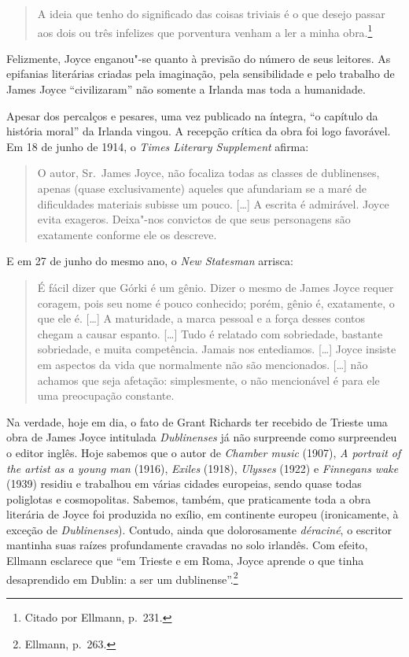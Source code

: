 \begin{quote}
A ideia que tenho do significado
das coisas triviais é o que desejo passar aos dois ou três infelizes que
porventura venham a ler a minha obra.\footnote{ Citado por Ellmann, p.~231.}
\end{quote}

Felizmente, Joyce enganou"-se quanto à previsão do número de seus leitores. As
epifanias literárias criadas pela imaginação, pela sensibilidade e pelo
trabalho de James Joyce “civilizaram” não somente a Irlanda mas toda a
humanidade.

Apesar dos percalços e pesares, uma vez publicado na íntegra, “o capítulo da
história moral” da Irlanda vingou. A recepção crítica da obra foi logo
favorável.  Em 18 de junho de 1914, o \textit{Times Literary Supplement}
afirma:

\begin{quote}
O autor, Sr.~James Joyce, não focaliza todas as classes de dublinenses, apenas
(quase exclusivamente) aqueles que afundariam se a maré de dificuldades
materiais subisse um pouco. [\ldots{}] A escrita é admirável. Joyce evita exageros.
Deixa"-nos convictos de que seus personagens são exatamente conforme ele os
descreve.
\end{quote}

E em 27 de junho do mesmo ano, o \textit{New Statesman} arrisca:

\begin{quote}
É fácil dizer que Górki é um gênio. Dizer o mesmo de James Joyce requer coragem,
pois seu nome é pouco conhecido; porém, gênio é, exatamente, o que ele é. [\ldots{}]
A maturidade, a marca pessoal e a força desses contos chegam a causar espanto.
[\ldots{}] Tudo é relatado com sobriedade, bastante sobriedade, e muita competência.
Jamais nos entediamos. [\ldots{}] Joyce insiste em aspectos da vida que normalmente
não são mencionados. [\ldots{}] não achamos que seja afetação: simplesmente, o não
mencionável é para ele uma preocupação constante.
\end{quote}

Na verdade, hoje em dia, o fato de Grant Richards ter recebido de Trieste uma
obra de James Joyce intitulada \textit{Dublinenses} já não surpreende como
surpreendeu o editor inglês. Hoje sabemos que o autor de \textit{Chamber music}
(1907), \textit{A portrait of the artist as a young man} (1916),
\textit{Exiles} (1918), \textit{Ulysses} (1922) e \textit{Finnegans wake}
(1939) residiu e trabalhou em várias cidades europeias, sendo quase todas
poliglotas e cosmopolitas. Sabemos, também, que praticamente toda a obra
literária de Joyce foi produzida no exílio, em continente europeu (ironicamente,
à exceção de \textit{Dublinenses}). Contudo, ainda que dolorosamente
\textit{déraciné}, o escritor mantinha suas raízes profundamente cravadas no
solo irlandês. Com efeito, Ellmann esclarece que “em Trieste e em Roma, Joyce
aprende o que tinha desaprendido em Dublin: a ser um dublinense”.\footnote{ Ellmann, p.~263.}


